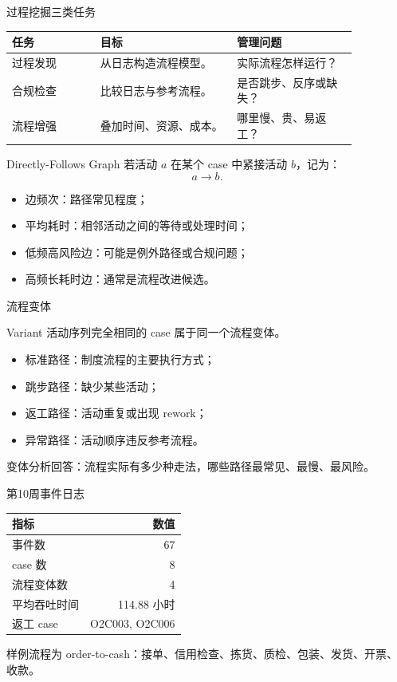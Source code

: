 \documentclass[UTF8,fontset=fandol,aspectratio=169,11pt]{ctexbeamer}
\begin{document}
\begin{frame}{过程挖掘三类任务}
\begin{center}
\begin{tabular}{p{0.22\linewidth}p{0.34\linewidth}p{0.30\linewidth}}
\toprule
任务 & 目标 & 管理问题\\
\midrule
过程发现 & 从日志构造流程模型。 & 实际流程怎样运行？\\
合规检查 & 比较日志与参考流程。 & 是否跳步、反序或缺失？\\
流程增强 & 叠加时间、资源、成本。 & 哪里慢、贵、易返工？\\
\bottomrule
\end{tabular}
\end{center}
\end{frame}

\begin{frame}{Directly-Follows Graph}
若活动 \(a\) 在某个 case 中紧接活动 \(b\)，记为：
\[
  a\rightarrow b.
\]
\begin{itemize}
  \item 边频次：路径常见程度；
  \item 平均耗时：相邻活动之间的等待或处理时间；
  \item 低频高风险边：可能是例外路径或合规问题；
  \item 高频长耗时边：通常是流程改进候选。
\end{itemize}
\end{frame}

\begin{frame}{流程变体}
\begin{block}{Variant}
活动序列完全相同的 case 属于同一个流程变体。
\end{block}
\begin{itemize}
  \item 标准路径：制度流程的主要执行方式；
  \item 跳步路径：缺少某些活动；
  \item 返工路径：活动重复或出现 rework；
  \item 异常路径：活动顺序违反参考流程。
\end{itemize}
\small
变体分析回答：流程实际有多少种走法，哪些路径最常见、最慢、最风险。
\end{frame}

\begin{frame}{第10周事件日志}
\begin{center}
\begin{tabular}{lr}
\toprule
指标 & 数值\\
\midrule
事件数 & 67\\
case 数 & 8\\
流程变体数 & 4\\
平均吞吐时间 & 114.88 小时\\
返工 case & O2C003, O2C006\\
\bottomrule
\end{tabular}
\end{center}
\small
样例流程为 order-to-cash：接单、信用检查、拣货、质检、包装、发货、开票、收款。
\end{frame}
\end{document}
